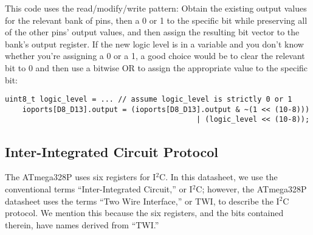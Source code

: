 This code uses the read/modify/write pattern:
Obtain the existing output values for the relevant bank of pins, then a 0 or 1 to the specific bit while preserving all of the other pins' output values, and then assign the resulting bit vector to the bank's output register.
If the new logic level is in a variable and you don't know whether you're assigning a 0 or a 1, a good choice would be to clear the relevant bit to 0 and then use a bitwise OR to assign the appropriate value to the specific bit:
\begin{lstlisting}[firstnumber=3]
    uint8_t logic_level = ... // assume logic_level is strictly 0 or 1
    ioports[D8_D13].output = (ioports[D8_D13].output & ~(1 << (10-8)))
                                            | (logic_level << (10-8));
\end{lstlisting}


\subsection{Inter-Integrated Circuit Protocol}

The ATmega328P uses six registers for I$^2$C\@.
In this datasheet, we use the conventional terms ``Inter-Integrated Circuit,'' or I$^2$C;
however, the ATmega328P datasheet\cite{ATmega328P} uses the terms ``Two Wire Interface,'' or TWI, to describe the I$^2$C protocol.
We mention this because the six registers, and the bits contained therein, have names derived from ``TWI.''

